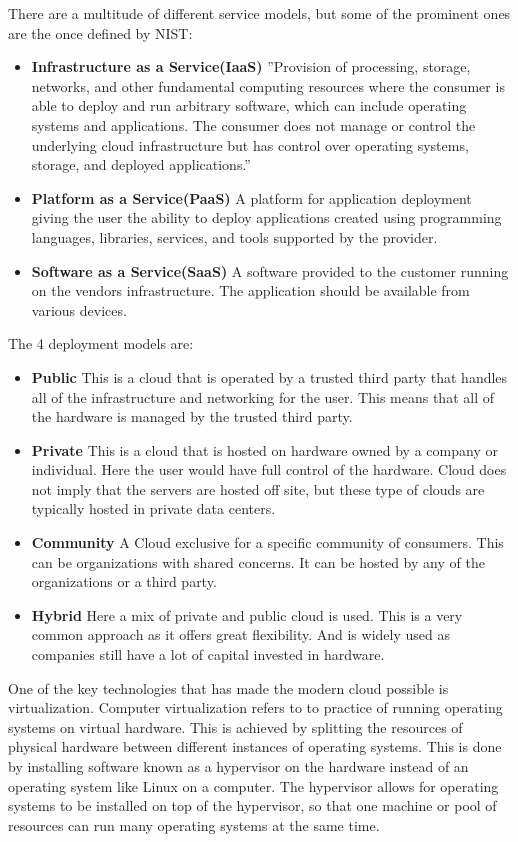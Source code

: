 \documentclass[]{uiophd}
\begin{document}
There are a multitude of different service models, but some of the prominent ones are the once defined by NIST:
\begin{itemize}
\item \textbf{Infrastructure as a Service(IaaS)} ''Provision of processing, storage, networks, and other fundamental computing resources where the consumer is able to deploy and run arbitrary software, which can include operating systems and applications. The consumer does not manage or control the underlying cloud infrastructure but has control over operating systems, storage, and deployed applications.''\parencite{Mell:2011:SND:2206223}
\item \textbf{Platform as a Service(PaaS)} A platform for application deployment giving the user the ability to deploy applications created using programming languages, libraries, services, and tools supported by the provider.
\item \textbf{Software as a Service(SaaS)} A software provided to the customer running on the vendors infrastructure. The application should be available from various devices.
\end{itemize}

The 4 deployment models are:
\begin{itemize}
\item \textbf{Public} This is a cloud that is operated by a trusted third party that handles all of the infrastructure and networking for the user. This means that all of the hardware is managed by the trusted third party.
\item \textbf{Private} This is a cloud that is hosted on hardware owned by a company or individual. Here the user would have full control of the hardware. Cloud does not imply that the servers are hosted off site, but these type of clouds are typically hosted in private data centers.  
\item \textbf{Community} A Cloud exclusive for a specific community of consumers. This can be organizations with shared concerns. It can be hosted by any of the organizations or a third party. 
\item \textbf{Hybrid} Here a mix of private and public cloud is used. This is a very common approach as it offers great flexibility. And is widely used as companies still have a lot of capital invested in hardware.
\end{itemize}
 
One of the key technologies that has made the modern cloud possible is virtualization. Computer virtualization refers to to practice of running operating systems on virtual hardware. This is achieved by splitting the resources of physical hardware between different instances of operating systems. This is done by installing software known as a hypervisor on the hardware instead of an operating system like Linux on a computer. The hypervisor allows for operating systems to be installed on top of the hypervisor, so that one machine or pool of resources can run many operating systems at the same time.\parencite{1430631}
\end{document}
